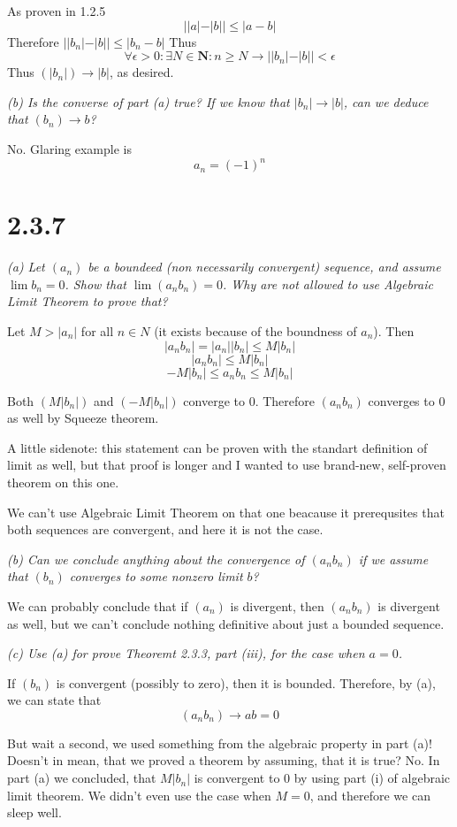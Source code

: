 \documentclass[11pt,oneside,titlepage]{article}
\begin{document}
As proven in 1.2.5
$$||a| - |b|| \leq |a - b|$$
Therefore  $ ||b_n| - |b|| \leq |b_n - b| $
Thus
$$\forall \epsilon > 0: \exists N \in \textbf{N}: n \geq N \to ||b_n| - |b|| < \epsilon$$
Thus $(|b_n|) \to |b|$, as desired.

\textit{(b) Is the converse of part (a) true? If we know that $|b_n| \to |b|$,
  can we deduce that $(b_n) \to b$?}

No. Glaring example is
$$a_n = (-1)^n$$

\section*{2.3.7}
\textit{(a) Let $(a_n)$ be a boundeed (non necessarily convergent) sequence,
  and assume $\lim b_n = 0$. Show that $\lim (a_n b_n) = 0$. Why are not
  allowed to use Algebraic Limit Theorem to prove that?}

Let $M > |a_n|$ for all $n \in N$ (it exists because of the boundness of $a_n$).
Then
$$ |a_n b_n| = |a_n||b_n| \leq M |b_n|$$
$$ |a_n b_n| \leq  M |b_n|$$
$$ -M|b_n| \leq a_n b_n \leq  M |b_n|$$

Both $(M|b_n|)$ and $(-M|b_n|)$ converge to 0. Therefore $(a_n b_n)$ converges
to 0 as well by Squeeze theorem.

A little sidenote: this statement can be proven with the standart definition
of limit as well, but that proof is longer and I wanted to use brand-new,
self-proven theorem on this one.

We can't use Algebraic Limit Theorem on that one beacause it prerequsites
that both sequences are convergent, and here it is not the case.

\textit{(b) Can we conclude anything about the convergence of $(a_n b_n)$
  if we assume that $(b_n)$ converges to some nonzero limit $b$?}

We can probably conclude that if $(a_n)$ is divergent, then $(a_n b_n)$ is
divergent as well, but we can't conclude nothing definitive about
just a bounded sequence.

\textit{(c) Use (a) for prove Theoremt 2.3.3, part (iii), for the case when
  $a = 0$.}

If $(b_n)$ is convergent (possibly to zero), then it is bounded.
Therefore, by (a), we can state that
$$(a_n b_n) \to a b = 0$$

But wait a second, we used something from the algebraic property in part (a)!
Doesn't in mean, that we proved a theorem by assuming, that it is true? No.
In part (a) we concluded, that $M|b_n|$ is convergent to 0 by using
part (i) of algebraic limit theorem. We didn't even use the case when
$M = 0$, and therefore we can sleep well.
\end{document}
